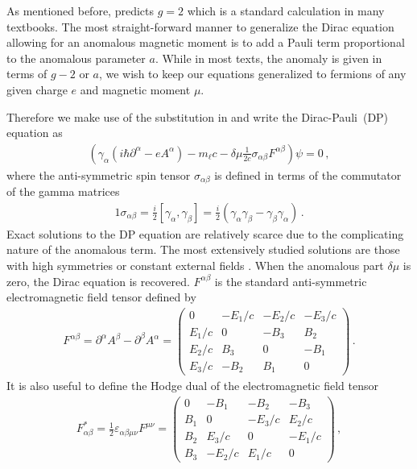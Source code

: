 As mentioned before,  predicts $g=2$ which is a standard calculation in many textbooks. The most straight-forward manner to generalize the Dirac equation allowing for an anomalous magnetic moment is to add a Pauli term proportional to the anomalous parameter $a$. While in most texts, the anomaly is given in terms of $g-2$ or $a$, we wish to keep our equations generalized to fermions of any given charge $e$ and magnetic moment $\mu$. 

Therefore we make use of the substitution in  and write the Dirac-Pauli~(DP) equation as
\begin{align}
	\label{dp:1}
    \left(\gamma_{\alpha}\left(i\hbar\partial^{\alpha} - eA^{\alpha}\right) - m_{\ell}c - \delta\mu\frac{1}{2c}\sigma_{\alpha\beta}F^{\alpha\beta}\right)\psi=0\,,
\end{align}
where the anti-symmetric spin tensor $\sigma_{\alpha\beta}$ is defined in terms of the commutator of the gamma matrices
\begin{alignat}{1}
	\label{sigma:1} \sigma_{\alpha\beta}=\frac{i}{2}\left[\gamma_{\alpha},\gamma_{\beta}\right]=\frac{i}{2}\left(\gamma_{\alpha}\gamma_{\beta}-\gamma_{\beta}\gamma_{\alpha}\right)\,.
\end{alignat}
Exact solutions to the DP equation are relatively scarce due to the complicating nature of the anomalous term. The most extensively studied solutions are those with high symmetries or constant external fields \citep{Thaller:1992ji}. When the anomalous part $\delta\mu$ is zero, the Dirac equation is recovered. $F^{\alpha\beta}$ is the standard anti-symmetric electromagnetic field tensor defined by
\begin{align}
    \label{em:1}
    F^{\alpha\beta} = \partial^{\alpha}A^{\beta} - \partial^{\beta}A^{\alpha} = 
    \begin{pmatrix}
        0        & -E_{1}/c  & -E_{2}/c  & -E_{3}/c\\
        E_{1}/c  & 0         & -B_{3}    & B_{2}\\
        E_{2}/c  & B_{3}     & 0         & -B_{1}\\
        E_{3}/c  & -B_{2}    & B_{1}     & 0
    \end{pmatrix}\,.
\end{align}
It is also useful to define the Hodge dual of the electromagnetic field tensor
\begin{align}
    \label{em:2}
    F_{\alpha\beta}^{*} = \frac{1}{2}\varepsilon_{\alpha\beta\mu\nu}F^{\mu\nu} = 
    \begin{pmatrix}
        0        & -B_{1}  & -B_{2}  & -B_{3}\\
        B_{1}  & 0         & -E_{3}/c    & E_{2}/c\\
        B_{2}  & E_{3}/c     & 0         & -E_{1}/c\\
        B_{3}  & -E_{2}/c    & E_{1}/c     & 0
    \end{pmatrix}\,,
\end{align}
